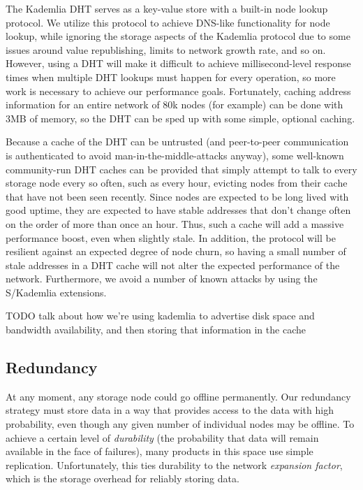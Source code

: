 \documentclass[a4paper,10pt]{article} \usepackage[utf8]{inputenc}
\newcommand{\todo}[1]{{\color{red} TODO #1 }}
\begin{document}
The Kademlia DHT serves as a key-value store with a built-in node lookup
protocol. We utilize this protocol to achieve DNS-like functionality for node
lookup, while ignoring the storage aspects of the Kademlia protocol due to some
issues around value republishing, limits to network growth rate, and so on.
However, using a DHT will make it difficult to achieve millisecond-level
response times when multiple DHT lookups must happen for every operation, so
more work is necessary to achieve our performance goals. Fortunately, caching
address information for an entire network of 80k nodes (for example) can be done
with 3MB of memory, so the DHT can be sped up with some simple, optional
caching.

Because a cache of the DHT can be untrusted (and peer-to-peer communication is
authenticated to avoid man-in-the-middle-attacks anyway), some well-known
community-run DHT caches can be provided that simply attempt to talk to every
storage node every so often, such as every hour, evicting nodes from their
cache that have not been seen recently.
Since nodes are expected to be long lived with good uptime, they
are expected to have stable addresses that don't change often on the order of
more than once an hour. Thus, such a cache will add a massive performance boost, even when slightly stale.
In addition, the protocol will be resilient against an expected degree of node
churn, so having a small number of stale addresses in a DHT cache will not alter
the expected performance of the network. Furthermore, we avoid a number of known
attacks by using the S/Kademlia extensions. \cite{skad}

\todo{talk about how we're using kademlia to advertise disk space and bandwidth
availability, and then storing that information in the cache}

\subsection{Redundancy}

At any moment, any storage node could go offline permanently. Our redundancy
strategy must store data in a way that provides access to the data with high
probability, even though any given number of individual nodes may be offline. To
achieve a certain level of {\em durability} (the probability that data will
remain available in the face of failures), many products in this space use
simple replication. Unfortunately, this ties durability to the network {\em
expansion factor}, which is the storage overhead for reliably storing data.
\end{document}

